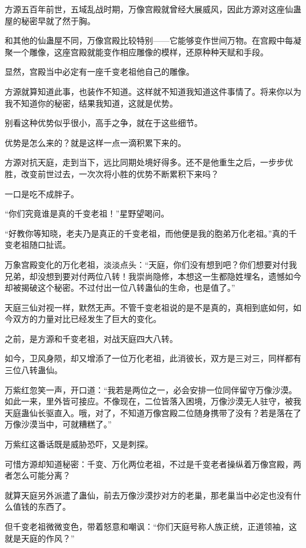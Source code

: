 \begin{this_body}
方源五百年前世，五域乱战时期，万像宫殿就曾经大展威风，因此方源对这座仙蛊屋的秘密早就了然于胸。

和其他的仙蛊屋不同，万像宫殿比较特别——它能够变作世间万物。在宫殿中每凝聚一个雕像，这座宫殿就能变作相应雕像的模样，还原种种天赋和手段。

显然，宫殿当中必定有一座千变老祖他自己的雕像。

方源就算知道此事，也装作不知道。这样就不知道我知道这件事情了。将来你以为我不知道你的秘密，结果我知道，这就是优势。

别看这种优势似乎很小，高手之争，就在于这些细节。

优势是怎么来的？就是这样一点一滴积累下来的。

方源对抗天庭，走到当下，远比同期处境好得多。还不是他重生之后，一步步优胜，改变前世过去，一次次将小胜的优势不断累积下来吗？

一口是吃不成胖子。

“你们究竟谁是真的千变老祖！”星野望喝问。

“好教你等知晓，老夫乃是真正的千变老祖，而他便是我的胞弟万化老祖。”真的千变老祖随口扯谎。

万象宫殿变化的万化老祖，淡淡点头：“天庭，你们没有想到吧？你们想要对付我兄弟，却没想到要对付两位八转！我崇尚隐修，本想这一生都隐姓埋名，遗憾如今却被揭破这个秘密。不过付出一位八转蛊仙的生命，也是值了。”

天庭三仙对视一样，默然无声。不管千变老祖说的是不是真的，真相到底如何，如今双方的力量对比已经发生了巨大的变化。

之前，是方源和千变老祖，对战天庭四大八转。

如今，卫风身陨，却又增添了一位万化老祖，此消彼长，双方是三对三，同样都有三位八转蛊仙。

万紫红忽笑一声，开口道：“我若是两位之一，必会安排一位同伴留守万像沙漠。如此一来，里外皆可接应。不像现在，二位皆落入困境，万像沙漠无人驻守，被我天庭蛊仙长驱直入。哦，对了，不知道万像宫殿二位随身携带了没有？若是落在了万像沙漠当中，可就糟糕了。”

万紫红这番话既是威胁恐吓，又是刺探。

可惜方源却知道秘密：千变、万化两位老祖，不过是千变老者操纵着万像宫殿，两者怎么可能分离？

就算天庭另外派遣了蛊仙，前去万像沙漠抄对方的老巢，那老巢当中必定也没有什么值钱的东西了。

但千变老祖微微变色，带着怒意和嘲讽：“你们天庭号称人族正统，正道领袖，这就是天庭的作风？”


\end{this_body}
